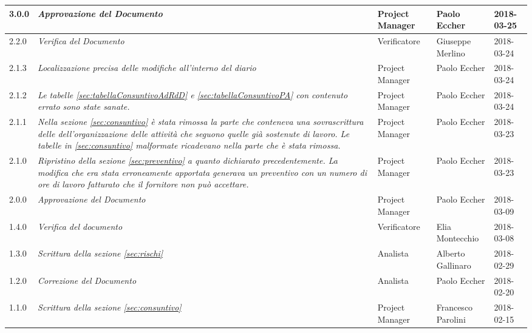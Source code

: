 \begin{longtable}[H]{C{2cm}|C{4cm}|C{3cm}|C{3cm}|R{2cm}}
		3.0.0 &\emph{Approvazione del Documento} & Project Manager & Paolo Eccher & 2018-03-25 \\
		\hline
		
		2.2.0 &\emph{Verifica del Documento} & Verificatore & Giuseppe Merlino & 2018-03-24 \\
		\hline
		
		2.1.3 &\emph{Localizzazione precisa delle modifiche all'interno del diario} & Project Manager & Paolo Eccher & 2018-03-24 \\
		\hline
		
		2.1.2 &\emph{ Le tabelle \ref{sec:tabellaConsuntivoAdRdD} e \ref{sec:tabellaConsuntivoPA} con contenuto errato sono state sanate.} & Project Manager & Paolo Eccher & 2018-03-24 \\
		\hline
		
		2.1.1 &\emph{ Nella sezione \ref{sec:consuntivo} è stata rimossa la parte che conteneva una sovrascrittura delle dell'organizzazione delle attività che seguono quelle già sostenute di lavoro. Le  tabelle in \ref{sec:consuntivo} malformate ricadevano nella parte che è stata rimossa.} & Project Manager & Paolo Eccher & 2018-03-23 \\
		\hline
		
		2.1.0 &\emph{Ripristino della sezione \ref{sec:preventivo} a quanto dichiarato precedentemente. La modifica che era stata erroneamente apportata generava un preventivo con un numero di ore di lavoro fatturato che il fornitore non può accettare. } & Project Manager & Paolo Eccher & 2018-03-23 \\
		\hline
		
		2.0.0 &\emph{Approvazione del Documento} & Project Manager & Paolo Eccher & 2018-03-09 \\
		\hline
		
		1.4.0 &\emph{Verifica del documento} & Verificatore & Elia Montecchio & 2018-03-08 \\
		\hline
		
		1.3.0 &\emph{Scrittura della sezione \ref{sec:rischi}} & Analista & Alberto Gallinaro & 2018-02-29 \\
		\hline

		1.2.0 &\emph{Correzione del Documento} & Analista & Paolo Eccher & 2018-02-20 \\
		\hline
		
		1.1.0 &\emph{Scrittura della sezione \ref{sec:consuntivo}} & Project Manager & Francesco Parolini & 2018-02-15 \\
		\hline
		

\end{longtable}
